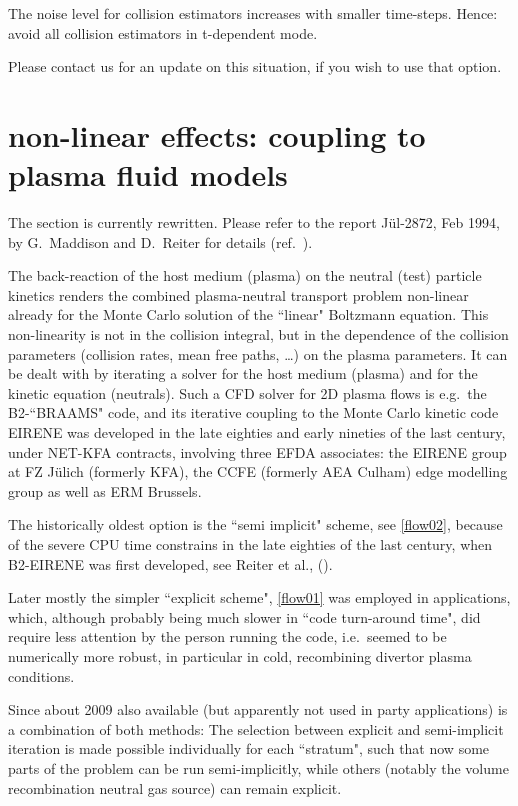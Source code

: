 The noise level for collision estimators increases with smaller time-steps.
Hence: avoid all collision estimators in t-dependent mode.

Please contact us for an update on this situation, if you wish to use that
option.

\newpage

\section{non-linear effects: coupling to plasma fluid models} \label{sec1.7}

The section is currently rewritten.
Please refer to the report J\"ul-2872, Feb 1994, by G.~Maddi\-son and D.~Reiter
for details (ref.\ \cite{kn:Maddison94}).

The back-reaction of the host medium (plasma) on the neutral (test) particle
kinetics renders the combined plasma-neutral transport problem non-linear
already for the Monte Carlo solution of the ``linear" Boltzmann equation.
This non-linearity is not in the collision integral, but in the dependence of
the collision parameters (collision rates, mean free paths, \dots) on the
plasma parameters.
It can be dealt with by iterating a solver for the host medium (plasma) and for
the kinetic equation (neutrals).
Such a \ac{CFD} solver for 2D plasma flows is e.g.\ the B2-``BRAAMS" code, and
its iterative coupling to the Monte Carlo kinetic code EIRENE was developed in
the late eighties and early nineties of the last century, under NET-KFA
contracts, involving three EFDA associates:
the EIRENE group at FZ J\"ulich (formerly KFA), the CCFE (formerly AEA Culham)
edge modelling group as well as ERM Brussels.

The historically oldest option is the ``semi implicit" scheme, see
\cref{flow02}, because of the severe CPU time constrains in the late eighties
of the last century, when B2-EIRENE was first developed, see Reiter et al.,
(\cite{kn:Net}).

Later mostly the simpler ``explicit scheme", \cref{flow01} was employed in
applications, which, although probably being much slower in ``code turn-around
time", did require less attention by the person running the code, i.e.\ seemed
to be numerically more robust, in particular in cold, recombining divertor
plasma conditions.

Since about 2009 also available (but apparently not used in 
party applications) is a combination of both methods:
The selection between explicit and semi-implicit iteration is made possible
individually for each ``stratum", such that now some parts of the problem can
be run semi-implicitly, while others (notably the volume recombination neutral
gas source) can remain explicit.

